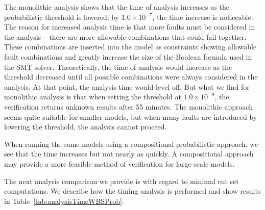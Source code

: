The monolithic analysis shows that the time of analysis increases as the probabilistic threshold is lowered; by $1.0 \times 10^{-7}$, the time increase is noticeable. The reason for increased analysis time is that more faults must be considered in the analysis -- there are more allowable combinations that could fail together. These combinations are inserted into the model as constraints showing allowable fault combinations and greatly increase the size of the Boolean formula used in the SMT solver. Theoretically, the time of analysis would increase as the threshold decreased until all possible combinations were always considered in the analysis. At that point, the analysis time would level off. But what we find for monolithic analysis is that when setting the threshold at $1.0 \times 10^{-9}$, the verification returns unknown results after 55 minutes. The monolithic approach seems quite suitable for smaller models, but when many faults are introduced by lowering the threshold, the analysis cannot proceed.

When running the same models using a compositional probabilistic approach, we see that the time increases but not nearly as quickly. A compositional approach may provide a more feasible method of verification for large scale models. 

The next analysis comparison we provide is with regard to minimal cut set computations. We describe how the timing analysis is performed and show results in Table~\ref{tab:analysisTimeWBSProb}. 

